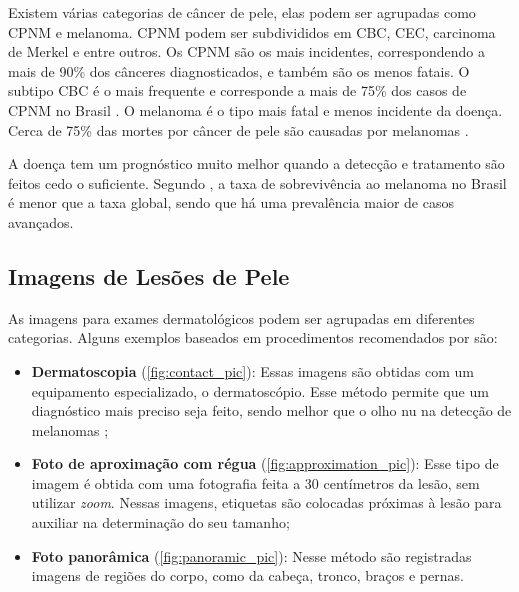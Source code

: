Existem várias categorias de câncer de pele, elas podem ser agrupadas como \ac{CPNM} e melanoma. \ac{CPNM} podem ser subdivididos em \ac{CBC}, \ac{CEC}, carcinoma de
Merkel e entre outros. Os \ac{CPNM} são os mais incidentes, correspondendo a mais de 90\% dos cânceres diagnosticados, e também são os menos fatais. O subtipo \ac{CBC} é o
mais frequente e corresponde a mais de 75\% dos casos de \ac{CPNM} no Brasil \cite{skin_cancer_zink}. O melanoma é o tipo mais fatal e menos incidente da doença. Cerca
de 75\% das mortes por câncer de pele são causadas por melanomas \cite{skin_cancer_screening}.

A doença tem um prognóstico muito melhor quando a detecção e tratamento são feitos cedo o suficiente. Segundo \textcite{skin_cancer_survival}, a taxa de sobrevivência ao
melanoma no Brasil é menor que a taxa global, sendo que há uma prevalência maior de casos avançados.

\subsection{Imagens de Lesões de Pele} \label{sec:skin_lesion_images}

As imagens para exames dermatológicos podem ser agrupadas em diferentes categorias. Alguns exemplos baseados em procedimentos recomendados por
\textcite{fotos_dermatologia} são:

\begin{itemize}
      \item \textbf{Dermatoscopia} (\autoref{fig:contact_pic}): Essas imagens são obtidas com um equipamento especializado, o dermatoscópio. Esse método permite que um
            diagnóstico mais preciso seja feito, sendo melhor que o olho nu na detecção de melanomas \cite{dermatoscopy};
      \item \textbf{Foto de aproximação com régua} (\autoref{fig:approximation_pic}): Esse tipo de imagem é obtida com uma fotografia feita a 30 centímetros da lesão,
            sem utilizar \textit{zoom}. Nessas imagens, etiquetas são colocadas próximas à lesão para auxiliar na determinação do seu tamanho;
      \item \textbf{Foto panorâmica} (\autoref{fig:panoramic_pic}): Nesse método são registradas imagens de regiões do corpo, como da cabeça, tronco, braços e pernas.
\end{itemize}

